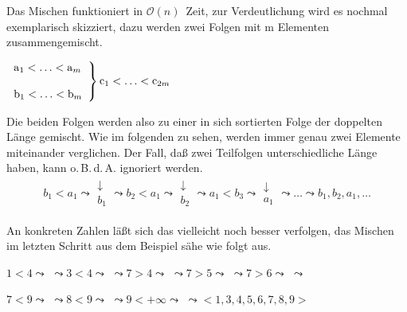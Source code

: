 \documentclass[ngerman,draft,parskip=half*,twoside]{scrreprt}
\theoremstyle{break}
\theoremstyle{nonumberbreak}
\newcommand*{\OO}{\mathcal{O}}      %
\begin{document}
Das Mischen funktioniert in $\OO(n)$~Zeit, zur Verdeutlichung wird es
nochmal exemplarisch skizziert, dazu werden zwei Folgen mit m
Elementen zusammengemischt.

$\left. 
\begin{array}{l}
{\textrm{\textup{a}}}_1<\ldots<{\textrm{\textup{a}}}_m\\
\phantom{leer}\\
{\textrm{\textup{b}}}_1<\ldots<{\textrm{\textup{b}}}_m
\end{array}
\right\} {\textrm{\textup{c}}}_1<\ldots<{\textrm{\textup{c}}}_{2m}$


Die beiden Folgen werden also zu einer in sich sortierten Folge der doppelten Länge gemischt. Wie im folgenden zu sehen, werden immer genau
zwei Elemente miteinander verglichen. Der Fall, daß zwei Teilfolgen unterschiedliche Länge haben, kann o.\,B.\,d.\,A. ignoriert werden.
\begin{align*}
  b_1<a_1 \leadsto
  \begin{array}{l}
    \downarrow\\
    b_1
  \end{array}
  \leadsto b_2<a_1 \leadsto
  \begin{array}{l}
    \downarrow\\
    b_2
  \end{array}
  \leadsto a_1<b_3 \leadsto
  \begin{array}{l}
    \downarrow\\
    a_1
  \end{array}
  \leadsto \ldots \leadsto b_1, b_2, a_1, \ldots
\end{align*}

An konkreten Zahlen läßt sich das vielleicht noch besser verfolgen, das Mischen im letzten Schritt aus dem Beispiel sähe wie folgt aus.


$1<4 \leadsto$  $\leadsto
3<4 \leadsto$  $\leadsto
7>4 \leadsto$  $\leadsto 
7>5 \leadsto$  $\leadsto
7>6 \leadsto$  $\leadsto$
\medskip

$7<9 \leadsto$  $\leadsto
8<9 \leadsto$  $\leadsto
9<+\infty \leadsto$  $
\leadsto<1,3,4,5,6,7,8,9>$
\medskip
\end{document}
